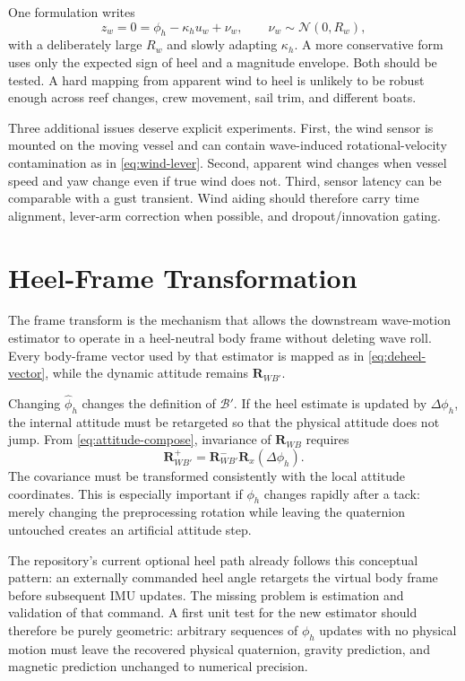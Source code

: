 \documentclass[conference]{IEEEtran}
\DeclareRobustCommand{\mat}[1]{\bm{#1}}
\begin{document}
One formulation writes
\begin{equation}
 z_w=0=\phi_h-\kappa_h u_w+\nu_w,
 \qquad \nu_w\sim\mathcal N(0,R_w),
 \label{eq:wind-pseudo}
\end{equation}
with a deliberately large $R_w$ and slowly adapting $\kappa_h$. A more conservative
form uses only the expected sign of heel and a magnitude envelope. Both should be tested.
A hard mapping from apparent wind to heel is unlikely to be robust enough across reef
changes, crew movement, sail trim, and different boats.

Three additional issues deserve explicit experiments. First, the wind sensor is mounted
on the moving vessel and can contain wave-induced rotational-velocity contamination as in
\eqref{eq:wind-lever}. Second, apparent wind changes when vessel speed and yaw change even
if true wind does not. Third, sensor latency can be comparable with a gust transient.
Wind aiding should therefore carry time alignment, lever-arm correction when possible,
and dropout/innovation gating.

\section{Heel-Frame Transformation}
\label{sec:heel-transform}

The frame transform is the mechanism that allows the downstream wave-motion estimator to
operate in a heel-neutral body frame without deleting wave roll. Every body-frame vector
used by that estimator is mapped as in \eqref{eq:deheel-vector}, while the dynamic
attitude remains $\mat R_{WB'}$.

Changing $\hat\phi_h$ changes the definition of $\mathcal B'$. If the heel estimate is
updated by $\Delta\phi_h$, the internal attitude must be retargeted so that the physical
attitude does not jump. From \eqref{eq:attitude-compose}, invariance of $\mat R_{WB}$
requires
\begin{equation}
 \boxed{
 \mat R_{WB'}^{+}=\mat R_{WB'}^{-}\mat R_x(\Delta\phi_h).}
 \label{eq:retarget}
\end{equation}
The covariance must be transformed consistently with the local attitude coordinates.
This is especially important if $\phi_h$ changes rapidly after a tack: merely changing
the preprocessing rotation while leaving the quaternion untouched creates an artificial
attitude step.

The repository's current optional heel path already follows this conceptual pattern: an
externally commanded heel angle retargets the virtual body frame before subsequent IMU
updates. The missing problem is estimation and validation of that command. A first unit
test for the new estimator should therefore be purely geometric: arbitrary sequences of
$\phi_h$ updates with no physical motion must leave the recovered physical quaternion,
gravity prediction, and magnetic prediction unchanged to numerical precision.
\end{document}
